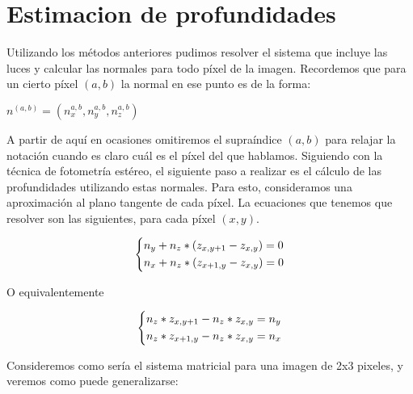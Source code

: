 \section{Estimacion de profundidades}

Utilizando los métodos anteriores pudimos resolver el sistema que incluye las luces y calcular las normales para todo píxel de la imagen. Recordemos que para un cierto píxel $(a, b)$ la normal en ese punto es de la forma:

\begin{center}
$n^{(a,b)} = (n_{x}^{a,b}, n_{y}^{a,b}, n_{z}^{a,b})$
\end{center}

A partir de aquí en ocasiones omitiremos el supraíndice $(a,b)$ para relajar la notación cuando es claro cuál es el píxel del que hablamos. Siguiendo con la técnica de fotometría estéreo, el siguiente paso a realizar es el cálculo de las profundidades utilizando estas normales. Para esto, consideramos una aproximación al plano tangente de cada píxel. La ecuaciones que tenemos que resolver son las siguientes, para cada píxel $(x ,y)$.

\begin{center}
\[
    \begin{dcases}
        n_{y} +  n_{z} * (z_{x, y+1} - z_{x, y}) = 0 \\
        n_{x} +  n_{z} * (z_{x+1, y} - z_{x, y}) = 0
    \end{dcases}
\]
\end{center}
O equivalentemente
\begin{center}
\[\begin{dcases}
        n_{z} * z_{x, y+1} - n_{z} *  z_{x, y} = n_{y}  \\
        n_{z} * z_{x+1, y} - n_{z} *  z_{x, y} = n_{x}
    \end{dcases}
\]
\end{center}

Consideremos como sería el sistema matricial para una imagen de 2x3 pixeles, y veremos como puede generalizarse: \\


